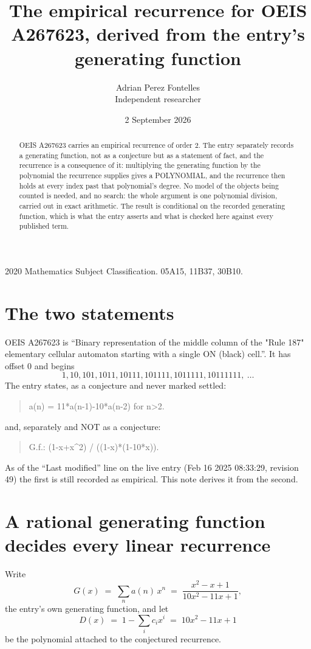 \documentclass[11pt,a4paper]{article}
\title{The empirical recurrence for OEIS A267623, derived from the entry's generating function}
\author{Adrian Perez Fontelles\\ \small Independent researcher}
\date{2 September 2026}
\theoremstyle{plain}
\theoremstyle{definition}
\begin{document}
\maketitle

\begin{abstract}
OEIS A267623 carries an empirical recurrence of order $2$. The entry separately records a
generating function, not as a conjecture but as a statement of fact, and the recurrence is a
consequence of it: multiplying the generating function by the polynomial the recurrence
supplies gives a POLYNOMIAL, and the recurrence then holds at every index past that
polynomial's degree. No model of the objects being counted is needed, and no search: the
whole argument is one polynomial division, carried out in exact arithmetic. The result is
conditional on the recorded generating function, which is what the entry asserts and what is
checked here against every published term.
\end{abstract}

\noindent\small 2020 Mathematics Subject Classification. 05A15, 11B37, 30B10.\normalsize

\section{The two statements}

OEIS A267623 is ``Binary representation of the middle column of the "Rule 187" elementary cellular automaton starting with a single ON (black) cell.''. It has offset $0$ and begins
\[
1, 10, 101, 1011, 10111, 101111, 1011111, 10111111,\ \dots
\]
The entry states, as a conjecture and never marked settled:
\begin{quote}
a(n) = 11*a(n-1)-10*a(n-2) for n>2.
\end{quote}
and, separately and NOT as a conjecture:
\begin{quote}
G.f.: (1-x+x\^{}2) / ((1-x)*(1-10*x)).
\end{quote}
As of the ``Last modified'' line on the live entry (Feb 16 2025 08:33:29, revision 49) the first is still
recorded as empirical. This note derives it from the second.

\section{A rational generating function decides every linear recurrence}

Write
\[
G(x)\;=\;\sum_{n}a(n)\,x^{n}\;=\;\frac{x^{2} - x + 1}{10 x^{2} - 11 x + 1},
\]
the entry's own generating function, and let
\[
D(x)\;=\;1-\sum_i c_i x^{i}\;=\;10 x^{2} - 11 x + 1
\]
be the polynomial attached to the conjectured recurrence.
\end{document}
